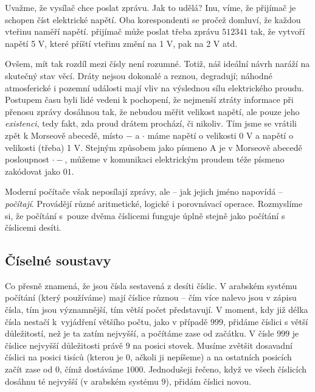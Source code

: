 Uvažme, že  vysílač chce poslat zprávu. Jak to udělá? Inu, víme, že
 přijímač je schopen číst elektrické napětí. Oba korespondenti se
pročež domluví, že  každou vteřinu naměří napětí. 
přijímač může poslat třeba zprávu $512341$  tak, že vytvoří
napětí 5 V, které příští vteřinu změní na 1 V, pak na 2 V atd.

Ovšem, mít tak  rozdíl mezi čísly není rozumné. Totiž, náš ideální
návrh naráží na skutečný stav věcí. Dráty nejsou dokonalé a reznou, degradují;
náhodné atmosferické i pozemní události mají vliv na výslednou sílu
elektrického proudu. Postupem času byli lidé vedeni k pochopení, že nejmenší
ztráty informace při přenosu zprávy dosáhnou tak, že nebudou měřit velikost
napětí, ale pouze jeho \emph{existenci}, tedy fakt, zda proud drátem prochází,
či nikoliv. Tím jsme se vrátili zpět k Morseově abecedě, místo $-$ a $ \cdot $
máme napětí o velikosti 0 V a napětí o velikosti (třeba) 1 V. Stejným způsobem
jako písmeno A je v Morseově abecedě posloupnost $ \cdot -$, můžeme v komunikaci
elektrickým proudem téže písmeno zakódovat jako $01$.

Moderní počítače však neposílají zprávy, ale -- jak jejich jméno napovídá --
\emph{počítají}. Provádějí různé aritmetické, logické i porovnávací operace.
Rozmyslíme si, že počítání s~pouze dvěma číslicemi funguje úplně stejně jako
počítání s číslicemi desíti.

\subsection{Číselné soustavy}
\label{ssec:ciselne-soustavy}

Co přesně znamená, že jsou čísla sestavená z desíti číslic. V arabském systému
počítání (který používáme) mají číslice různou  -- čím více
nalevo jsou v zápisu čísla, tím jsou významnější, tím větší počet představují. V
moment, kdy již délka čísla nestačí k~vyjádření většího počtu, jako v případě
$999$, přidáme číslici s větší důležitostí, než je ta zatím nejvyšší, a počítáme
zase od začátku. V čísle $999$ je číslice nejvyšší důležitosti právě $9$ na
posici stovek. Musíme zvětšit dosavadní číslici na posici tisíců (kterou je $0$,
ačkoli ji nepíšeme) a na ostatních posicích začít zase od $0$, čímž dostáváme
$1000$. Jednodušeji řečeno, když ve všech číslicích dosáhnu té nejvyšší (v
arabském systému $9$), přidám číslici novou.

